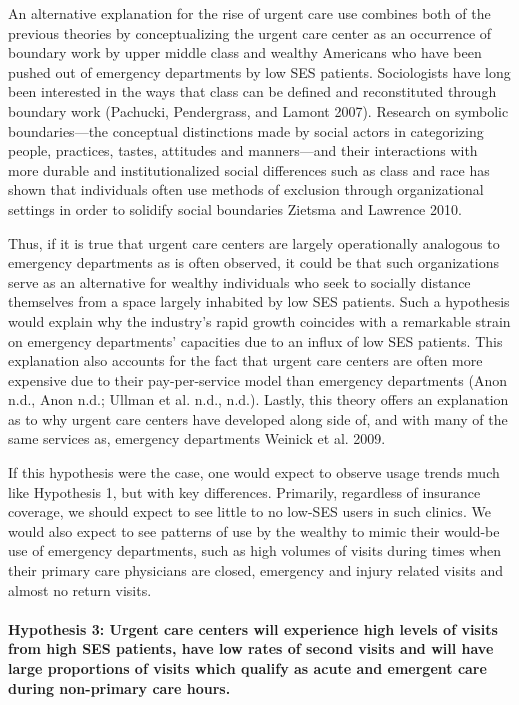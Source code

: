 \documentclass[12pt,twoside]{reedthesis}
\begin{document}
  An alternative explanation for the rise of urgent care use combines both
  of the previous theories by conceptualizing the urgent care center as an
  occurrence of boundary work by upper middle class and wealthy Americans
  who have been pushed out of emergency departments by low SES patients.
  Sociologists have long been interested in the ways that class can be
  defined and reconstituted through boundary work (Pachucki, Pendergrass,
  and Lamont 2007). Research on symbolic boundaries---the conceptual
  distinctions made by social actors in categorizing people, practices,
  tastes, attitudes and manners---and their interactions with more durable
  and institutionalized social differences such as class and race has
  shown that individuals often use methods of exclusion through
  organizational settings in order to solidify social boundaries Zietsma
  and Lawrence 2010.
  
  Thus, if it is true that urgent care centers are largely operationally
  analogous to emergency departments as is often observed, it could be
  that such organizations serve as an alternative for wealthy individuals
  who seek to socially distance themselves from a space largely inhabited
  by low SES patients. Such a hypothesis would explain why the industry's
  rapid growth coincides with a remarkable strain on emergency
  departments' capacities due to an influx of low SES patients. This
  explanation also accounts for the fact that urgent care centers are
  often more expensive due to their pay-per-service model than emergency
  departments (Anon n.d., Anon n.d.; Ullman et al. n.d., n.d.). Lastly,
  this theory offers an explanation as to why urgent care centers have
  developed along side of, and with many of the same services as,
  emergency departments Weinick et al. 2009.
  
  If this hypothesis were the case, one would expect to observe usage
  trends much like Hypothesis 1, but with key differences. Primarily,
  regardless of insurance coverage, we should expect to see little to no
  low-SES users in such clinics. We would also expect to see patterns of
  use by the wealthy to mimic their would-be use of emergency departments,
  such as high volumes of visits during times when their primary care
  physicians are closed, emergency and injury related visits and almost no
  return visits.
  
  \paragraph{Hypothesis 3: Urgent care centers will experience high levels
  of visits from high SES patients, have low rates of second visits and
  will have large proportions of visits which qualify as acute and
  emergent care during non-primary care
  hours.}\label{hypothesis-3-urgent-care-centers-will-experience-high-levels-of-visits-from-high-ses-patients-have-low-rates-of-second-visits-and-will-have-large-proportions-of-visits-which-qualify-as-acute-and-emergent-care-during-non-primary-care-hours.}
  
\end{document}
